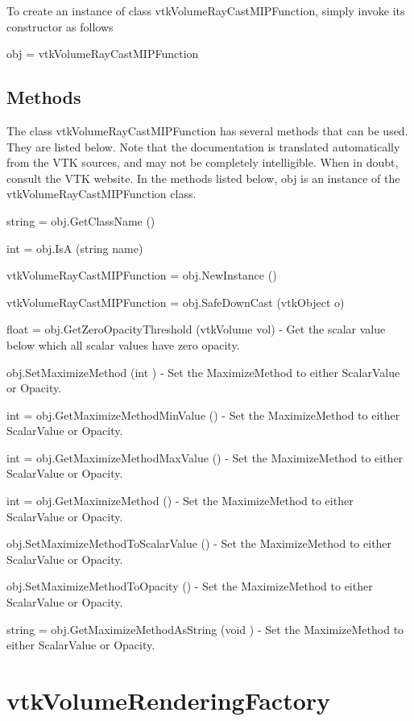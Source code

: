 To create an instance of class vtk\-Volume\-Ray\-Cast\-M\-I\-P\-Function, simply invoke its constructor as follows \begin{DoxyVerb}  obj = vtkVolumeRayCastMIPFunction
\end{DoxyVerb}
 \hypertarget{vtkwidgets_vtkxyplotwidget_Methods}{}\subsection{Methods}\label{vtkwidgets_vtkxyplotwidget_Methods}
The class vtk\-Volume\-Ray\-Cast\-M\-I\-P\-Function has several methods that can be used. They are listed below. Note that the documentation is translated automatically from the V\-T\-K sources, and may not be completely intelligible. When in doubt, consult the V\-T\-K website. In the methods listed below, {\ttfamily obj} is an instance of the vtk\-Volume\-Ray\-Cast\-M\-I\-P\-Function class. 
\begin{DoxyItemize}
\item {\ttfamily string = obj.\-Get\-Class\-Name ()}  
\item {\ttfamily int = obj.\-Is\-A (string name)}  
\item {\ttfamily vtk\-Volume\-Ray\-Cast\-M\-I\-P\-Function = obj.\-New\-Instance ()}  
\item {\ttfamily vtk\-Volume\-Ray\-Cast\-M\-I\-P\-Function = obj.\-Safe\-Down\-Cast (vtk\-Object o)}  
\item {\ttfamily float = obj.\-Get\-Zero\-Opacity\-Threshold (vtk\-Volume vol)} -\/ Get the scalar value below which all scalar values have zero opacity.  
\item {\ttfamily obj.\-Set\-Maximize\-Method (int )} -\/ Set the Maximize\-Method to either Scalar\-Value or Opacity.  
\item {\ttfamily int = obj.\-Get\-Maximize\-Method\-Min\-Value ()} -\/ Set the Maximize\-Method to either Scalar\-Value or Opacity.  
\item {\ttfamily int = obj.\-Get\-Maximize\-Method\-Max\-Value ()} -\/ Set the Maximize\-Method to either Scalar\-Value or Opacity.  
\item {\ttfamily int = obj.\-Get\-Maximize\-Method ()} -\/ Set the Maximize\-Method to either Scalar\-Value or Opacity.  
\item {\ttfamily obj.\-Set\-Maximize\-Method\-To\-Scalar\-Value ()} -\/ Set the Maximize\-Method to either Scalar\-Value or Opacity.  
\item {\ttfamily obj.\-Set\-Maximize\-Method\-To\-Opacity ()} -\/ Set the Maximize\-Method to either Scalar\-Value or Opacity.  
\item {\ttfamily string = obj.\-Get\-Maximize\-Method\-As\-String (void )} -\/ Set the Maximize\-Method to either Scalar\-Value or Opacity.  
\end{DoxyItemize}\hypertarget{vtkvolumerendering_vtkvolumerenderingfactory}{}\section{vtk\-Volume\-Rendering\-Factory}\label{vtkvolumerendering_vtkvolumerenderingfactory}
